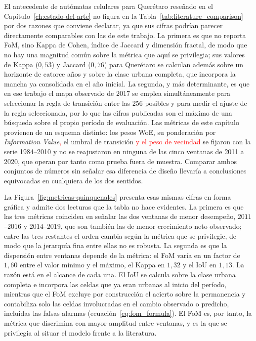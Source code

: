El antecedente de autómatas celulares para Querétaro reseñado en el Capítulo~\ref{ch:estado-del-arte} \parencite{JimenezLopez2018} no figura en la Tabla~\ref{tab:literature_comparison} por dos razones que conviene declarar, ya que sus cifras podrían parecer directamente comparables con las de este trabajo. La primera es que no reporta FoM, sino Kappa de Cohen, índice de Jaccard y dimensión fractal, de modo que no hay una magnitud común sobre la métrica que aquí se privilegia; sus valores de Kappa ($0{,}53$) y Jaccard ($0{,}76$) para Querétaro se calculan además sobre un horizonte de catorce años y sobre la clase urbana completa, que incorpora la mancha ya consolidada en el año inicial. La segunda, y más determinante, es que en ese trabajo el mapa observado de 2017 se emplea simultáneamente para seleccionar la regla de transición entre las 256 posibles y para medir el ajuste de la regla seleccionada, por lo que las cifras publicadas son el máximo de una búsqueda sobre el propio período de evaluación. Las métricas de este capítulo provienen de un esquema distinto: los pesos WoE, su ponderación por \textit{Information Value}\textcolor{red}{,} el umbral de transición \textcolor{red}{y el peso de vecindad} se fijaron con la serie 1984--2010 y no se reajustaron en ninguna de las cinco ventanas de 2011 a 2020, que operan por tanto como prueba fuera de muestra. Comparar ambos conjuntos de números sin señalar esa diferencia de diseño llevaría a conclusiones equivocadas en cualquiera de los dos sentidos.

La Figura~\ref{fig:metricas-quinquenales} presenta esas mismas cifras en forma gráfica y admite dos lecturas que la tabla no hace evidentes. La primera es que las tres métricas coinciden en señalar las dos ventanas de menor desempeño, $2011$--$2016$ y $2014$--$2019$, que son también las de menor crecimiento neto observado; entre las tres restantes el orden cambia según la métrica que se privilegie, de modo que la jerarquía fina entre ellas no es robusta. La segunda es que la dispersión entre ventanas depende de la métrica: el FoM varía en un factor de $1{,}60$ entre el valor mínimo y el máximo, el Kappa en $1{,}32$ y el IoU en $1{,}13$. La razón está en el alcance de cada una. El IoU se calcula sobre la clase urbana completa e incorpora las celdas que ya eran urbanas al inicio del período, mientras que el FoM excluye por construcción el acierto sobre la permanencia y contabiliza solo las celdas involucradas en el cambio observado o predicho, incluidas las falsas alarmas (ecuación~\ref{eq:fom_formula}). El FoM es, por tanto, la métrica que discrimina con mayor amplitud entre ventanas, y es la que se privilegia al situar el modelo frente a la literatura.

